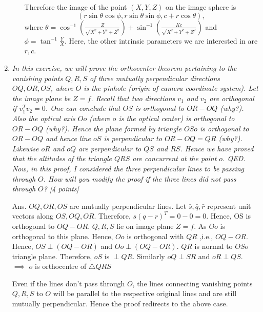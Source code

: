 \documentclass[11pt]{article}
\begin{document}
\begin{enumerate}
\begin{itemize}
Therefore the image of the point $(X,Y,Z)$ on the image sphere is 
\[
(r\sin{\theta}\cos{\phi}, r\sin{\theta}\sin{\phi}, c+r\cos{\theta}),
\]
where $\theta=\cos^{-1}(\frac{Z}{\sqrt{X^2+Y^2+Z^2}})+\sin^{-1}(\frac{Kc}{\sqrt{X^2+Y^2+Z^2}})$ and $\phi = \tan ^{-1}{\frac{Y}{X}}$. Here, the other intrinsic parameters we are interested in are $r,c$. 
	
\end{itemize}


\item \textit{In this exercise, we will prove the orthocenter theorem pertaining to the vanishing points $Q,R,S$ of three mutually perpendicular directions $OQ, OR, OS$, where $O$ is the pinhole (origin of camera coordinate system). Let the image plane be $Z = f$. Recall that two directions $v_1$ and $v_2$ are orthogonal if $v^T_1 v_2 = 0$. One can conclude that $OS$ is orthogonal to $OR-OQ$ (why?). Also the optical axis $Oo$ (where $o$ is the optical center) is orthogonal to $OR-OQ$ (why?). Hence the plane formed by triangle $OSo$ is orthogonal to $OR-OQ$ and hence line $oS$ is perpendicular to $OR-OQ = QR$ (why?). Likewise $oR$ and $oQ$ are perpendicular to $QS$ and $RS$. Hence we have proved that the altitudes of the triangle $QRS$ are concurrent at the point $o$. QED. Now, in this proof, I considered the three perpendicular lines to be passing through $O$. How will you modify the proof if the three lines did not pass through $O$? \textsf{[4 points]}}
\item[Ans.] $OQ, OR, OS$ are mutually perpendicular lines.\newline
Let $\bar{s},\bar{q},\bar{r}$ represent unit vectors along $OS, OQ,OR$. Therefore, $s(q-r)^{T}=0-0=0$.\newline
Hence, OS is orthogonal to $OQ-OR$. $Q,R,S$ lie on image plane $Z=f$. As $Oo$ is orthogonal to this plane. Hence, $Oo$ is orthogonal with $QR$ ,i.e., $OQ-OR$.\newline
Hence, $OS\perp(OQ-OR)$ and $Oo\perp(OQ-OR)$. $QR$ is normal to $OSo$ triangle plane.\newline
Therefore, $oS$ is $\perp QR$. Similarly $oQ \perp SR$ and $oR \perp QS$. \newline
$\implies$ $o$ is orthocentre of $\triangle QRS$ 

Even if the lines don't pass through $O$, the lines connecting vanishing points $Q,R,S$ to $O$ will be parallel to the respective original lines and are still mutually perpendicular. Hence the proof redirects to the above case.    
   


\end{enumerate}
\end{document}
